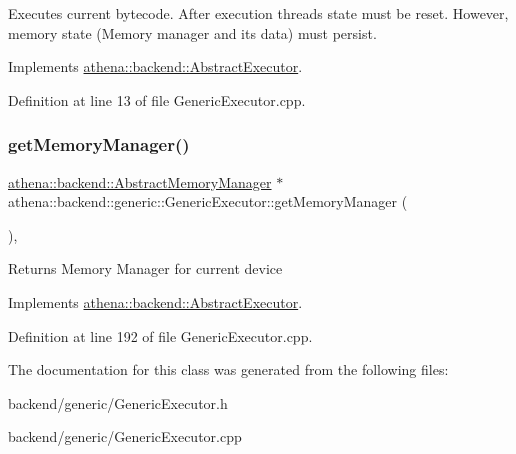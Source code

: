 Executes current bytecode. After execution threads state must be reset. However, memory state (Memory manager and its data) must persist. 

Implements \mbox{\hyperlink{classathena_1_1backend_1_1_abstract_executor_a5f179146ae76002b678a4862553f87ce}{athena\+::backend\+::\+Abstract\+Executor}}.



Definition at line 13 of file Generic\+Executor.\+cpp.

\mbox{\label{classathena_1_1backend_1_1generic_1_1_generic_executor_a0560a1dfc0c70ebef0b5be26bb82b9c5}} 
\subsubsection{\texorpdfstring{get\+Memory\+Manager()}{getMemoryManager()}}
{\footnotesize\ttfamily \mbox{\hyperlink{classathena_1_1backend_1_1_abstract_memory_manager}{athena\+::backend\+::\+Abstract\+Memory\+Manager}} $\ast$ athena\+::backend\+::generic\+::\+Generic\+Executor\+::get\+Memory\+Manager (\begin{DoxyParamCaption}{ }\end{DoxyParamCaption})\hspace{0.3cm}{\ttfamily [override]}, {\ttfamily [virtual]}}

\begin{DoxyReturn}{Returns}
Memory Manager for current device 
\end{DoxyReturn}


Implements \mbox{\hyperlink{classathena_1_1backend_1_1_abstract_executor_a6d61486e2a06500c9c0aa1e03a475e4a}{athena\+::backend\+::\+Abstract\+Executor}}.



Definition at line 192 of file Generic\+Executor.\+cpp.



The documentation for this class was generated from the following files\+:\begin{DoxyCompactItemize}
\item 
backend/generic/Generic\+Executor.\+h\item 
backend/generic/Generic\+Executor.\+cpp\end{DoxyCompactItemize}
